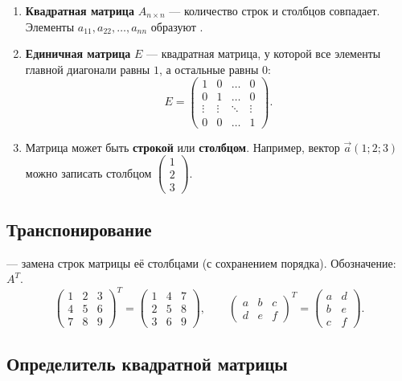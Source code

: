 \documentclass[11pt,a4paper]{article}
\begin{document}
\begin{enumerate}
\item \textbf{Квадратная матрица} $A_{n\times n}$ — количество строк и столбцов совпадает. Элементы $a_{11},a_{22},\dots,a_{nn}$
образуют .
\item \textbf{Единичная матрица} $E$ — квадратная матрица, у которой все элементы главной диагонали равны $1$, а остальные равны $0$:
\[
E=\begin{pmatrix}
1&0&\dots&0\\ 0&1&\dots&0\\ \vdots&\vdots&\ddots&\vdots\\ 0&0&\dots&1
\end{pmatrix}.
\]
\item Матрица может быть \textbf{строкой} или \textbf{столбцом}. Например, вектор $\vec a(1;2;3)$ можно записать столбцом
$\begin{pmatrix}1\\2\\3\end{pmatrix}$.
\end{enumerate}

\subsection{Транспонирование}

\begin{opr}
 — замена строк матрицы её столбцами (с сохранением порядка). Обозначение: $A^T$.
\[
\begin{pmatrix}1&2&3\\4&5&6\\7&8&9\end{pmatrix}^{\!T}=\begin{pmatrix}1&4&7\\2&5&8\\3&6&9\end{pmatrix},\qquad
\begin{pmatrix}a&b&c\\d&e&f\end{pmatrix}^{\!T}=\begin{pmatrix}a&d\\b&e\\c&f\end{pmatrix}.
\]
\end{opr}

\subsection{Определитель квадратной матрицы}
\end{document}
